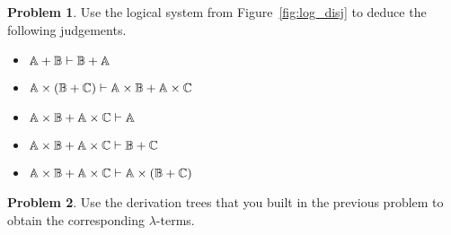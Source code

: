\documentclass[a4paper, 11pt]{article}
\theoremstyle{definition}
\newtheorem{problem}{Problem}
\begin{document}
\begin{problem}
        Use the logical system from Figure~\ref{fig:log_disj} to deduce the
        following judgements.

  \begin{itemize}
          \item $\mathbb{A} + \mathbb{B} \vdash \mathbb{B} + \mathbb{A}$ 
          \item $\mathbb{A} \times (\mathbb{B} + \mathbb{C}) \vdash
                \mathbb{A} \times \mathbb{B} + \mathbb{A} \times \mathbb{C}$
          \item $\mathbb{A} \times \mathbb{B} + \mathbb{A} \times \mathbb{C} \vdash \mathbb{A}$
          \item $\mathbb{A} \times \mathbb{B} + \mathbb{A} \times \mathbb{C} \vdash \mathbb{B} + \mathbb{C}$
          \item $\mathbb{A} \times \mathbb{B} + \mathbb{A} \times \mathbb{C} \vdash
                  \mathbb{A} \times (\mathbb{B} + \mathbb{C})$
  \end{itemize}        
\end{problem}

\begin{problem}
        Use the derivation trees that you built in the previous problem to
        obtain the corresponding $\lambda$-terms.
\end{problem}
\end{document}
